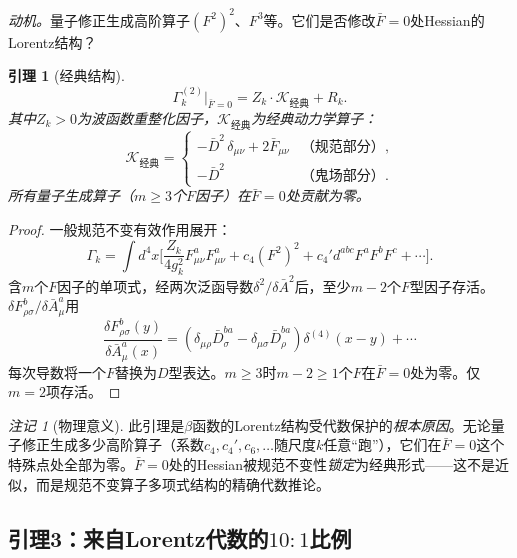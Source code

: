 \documentclass[12pt,a4paper]{article}
\theoremstyle{plain}
\newtheorem{lemma}[theorem]{引理}
\theoremstyle{definition}
\theoremstyle{remark}
\newtheorem{remark}[theorem]{注记}
\begin{document}
\textit{动机。}量子修正生成高阶算子$(F^2)^2$、$F^3$等。它们是否修改$\bar{F}=0$处Hessian的Lorentz结构？

\begin{lemma}[经典结构]\label{lem:cl}
\begin{equation}\label{eq:classical}
\Gamma_k^{(2)}\big|_{\bar{F}=0} = Z_k\cdot\mathcal{K}_{\text{经典}} + R_k.
\end{equation}
其中$Z_k>0$为波函数重整化因子，$\mathcal{K}_{\text{经典}}$为经典动力学算子：
\begin{equation}
\mathcal{K}_{\text{经典}} = \begin{cases}
-\bar{D}^2\,\delta_{\mu\nu} + 2\bar{F}_{\mu\nu} &\text{（规范部分）},\\
-\bar{D}^2 &\text{（鬼场部分）}.
\end{cases}
\end{equation}
所有量子生成算子（$m\geq 3$个$F$因子）在$\bar{F}=0$处贡献为零。
\end{lemma}

\begin{proof}
一般规范不变有效作用展开：
\begin{equation}\label{eq:Gammaexpand}
\Gamma_k = \int d^4x\Big[\frac{Z_k}{4g_k^2}F_{\mu\nu}^aF_{\mu\nu}^a + c_4(F^2)^2 + c_4'd^{abc}F^aF^bF^c + \cdots\Big].
\end{equation}
含$m$个$F$因子的单项式，经两次泛函导数$\delta^2/\delta\bar{A}^2$后，至少$m-2$个$F$型因子存活。$\delta F_{\rho\sigma}^b/\delta\bar{A}_\mu^a$用
\begin{equation}\label{eq:dFdA}
\frac{\delta F_{\rho\sigma}^b(y)}{\delta\bar{A}_\mu^a(x)} = (\delta_{\mu\rho}\bar{D}_\sigma^{ba}-\delta_{\mu\sigma}\bar{D}_\rho^{ba})\delta^{(4)}(x-y)+\cdots
\end{equation}
每次导数将一个$F$替换为$D$型表达。$m\geq 3$时$m-2\geq 1$个$F$在$\bar{F}=0$处为零。仅$m=2$项存活。
\end{proof}

\begin{remark}[物理意义]\label{rem:locking}
此引理是$\beta$函数的Lorentz结构受代数保护的\emph{根本原因}。无论量子修正生成多少高阶算子（系数$c_4,c_4',c_6,\ldots$随尺度$k$任意``跑''），它们在$\bar{F}=0$这个特殊点处全部为零。$\bar{F}=0$处的Hessian被规范不变性\emph{锁定}为经典形式——这不是近似，而是规范不变算子多项式结构的精确代数推论。
\end{remark}

\subsection{引理3：来自Lorentz代数的$10{:}1$比例}\label{sec:lemma3}
\end{document}
